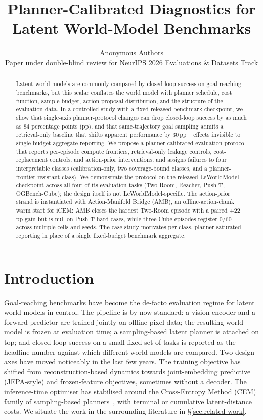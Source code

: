 \documentclass{article}
\title{Planner-Calibrated Diagnostics for Latent World-Model Benchmarks}
\author{%
  Anonymous Authors\\
  Paper under double-blind review for NeurIPS 2026 Evaluations \& Datasets Track\\
}
\begin{document}
\maketitle

\begin{abstract}
Latent world models are commonly compared by closed-loop success on goal-reaching benchmarks, but this scalar conflates the world model with planner schedule, cost function, sample budget, action-proposal distribution, and the structure of the evaluation data. In a controlled study with a fixed released benchmark checkpoint, we show that single-axis planner-protocol changes can drop closed-loop success by as much as $84$ percentage points (pp), and that same-trajectory goal sampling admits a retrieval-only baseline that shifts apparent performance by $30$\,pp -- effects invisible to single-budget aggregate reporting. We propose a planner-calibrated evaluation protocol that reports per-episode compute frontiers, retrieval-only leakage controls, cost-replacement controls, and action-prior interventions, and assigns failures to four interpretable classes (calibration-only, two coverage-bound classes, and a planner-frontier-resistant class). We demonstrate the protocol on the released LeWorldModel checkpoint across all four of its evaluation tasks (Two-Room, Reacher, Push-T, OGBench-Cube); the design itself is not LeWorldModel-specific. The action-prior strand is instantiated with Action-Manifold Bridge (AMB), an offline-action-chunk warm start for iCEM: AMB closes the hardest Two-Room episode with a paired $+22$\,pp gain but is null on Push-T hard cases, while three Cube episodes register $0/60$ across multiple cells and seeds. The case study motivates per-class, planner-saturated reporting in place of a single fixed-budget benchmark aggregate.
\end{abstract}

\section{Introduction}
\label{sec:intro}

Goal-reaching benchmarks have become the de-facto evaluation regime for latent world models in control. The pipeline is by now standard: a vision encoder and a forward predictor are trained jointly on offline pixel data; the resulting world model is frozen at evaluation time; a sampling-based latent planner is attached on top; and closed-loop success on a small fixed set of tasks is reported as the headline number against which different world models are compared. Two design axes have moved noticeably in the last few years. The training objective has shifted from reconstruction-based dynamics towards joint-embedding predictive (JEPA-style) and frozen-feature objectives, sometimes without a decoder. The inference-time optimiser has stabilised around the Cross-Entropy Method (CEM) family of sampling-based planners~\cite{rubinstein2004crossentropy}, with terminal or cumulative latent-distance costs. We situate the work in the surrounding literature in \S\ref{sec:related-work}.
\end{document}
